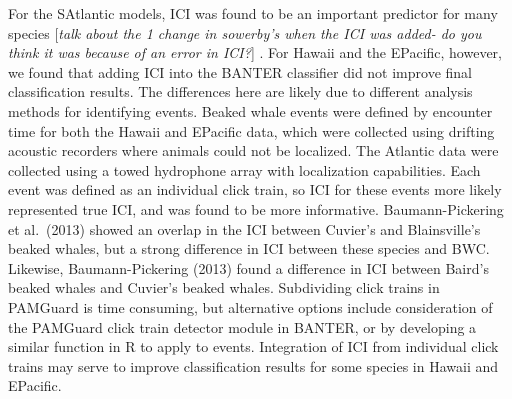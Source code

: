 \documentclass[
  letterpaper,
  DIV=11,
  numbers=noendperiod]{scrartcl}
\begin{document}
For the SAtlantic models, ICI was found to be an important predictor for
many species {[}\emph{talk about the 1 change in sowerby's when the ICI
was added- do you think it was because of an error in ICI?}{]} . For
Hawaii and the EPacific, however, we found that adding ICI into the
BANTER classifier did not improve final classification results. The
differences here are likely due to different analysis methods for
identifying events. Beaked whale events were defined by encounter time
for both the Hawaii and EPacific data, which were collected using
drifting acoustic recorders where animals could not be localized. The
Atlantic data were collected using a towed hydrophone array with
localization capabilities. Each event was defined as an individual click
train, so ICI for these events more likely represented true ICI, and was
found to be more informative. Baumann-Pickering et al.~(2013) showed an
overlap in the ICI between Cuvier's and Blainsville's beaked whales, but
a strong difference in ICI between these species and BWC. Likewise,
Baumann-Pickering (2013) found a difference in ICI between Baird's
beaked whales and Cuvier's beaked whales. Subdividing click trains in
PAMGuard is time consuming, but alternative options include
consideration of the PAMGuard click train detector module in BANTER, or
by developing a similar function in R to apply to events. Integration of
ICI from individual click trains may serve to improve classification
results for some species in Hawaii and EPacific.
\end{document}
